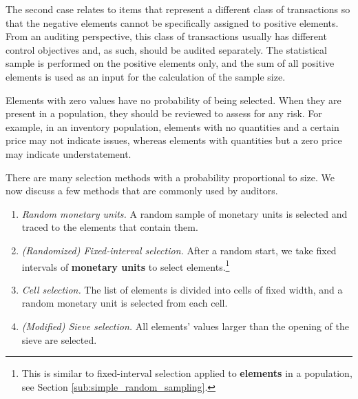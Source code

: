 The second case relates to items that represent a different class of transactions so that the negative elements cannot be specifically assigned to positive elements. From an auditing perspective, this class of transactions usually has different control objectives and, as such, should be audited separately. The statistical sample is performed on the positive elements only, and the sum of all positive elements is used as an input for the calculation of the sample size.

Elements with zero values have no probability of being selected. When they are present in a population, they should be reviewed to assess for any risk. For example, in an inventory population, elements with no quantities and a certain price may not indicate issues, whereas elements with quantities but a zero price may indicate  understatement.

\bigskip
There are many selection methods with a probability proportional to size. We now discuss a few methods that are commonly used by auditors. 
\begin{enumerate}
\item \textit{Random monetary units.} A random sample of monetary units is selected and traced to the elements that contain them.
\item \textit{(Randomized) Fixed-interval selection.} After a random start, we take fixed intervals of \textbf{monetary units} to select elements.\footnote{This is similar to fixed-interval selection applied to \textbf{elements} in a population, see Section \ref{sub:simple_random_sampling}.}
\item \textit{Cell selection.} The list of elements is divided into cells of fixed width, and a random monetary unit is selected from each cell.
\item \textit{(Modified) Sieve selection.} All elements' values larger than the opening of the sieve are selected.
\end{enumerate}

